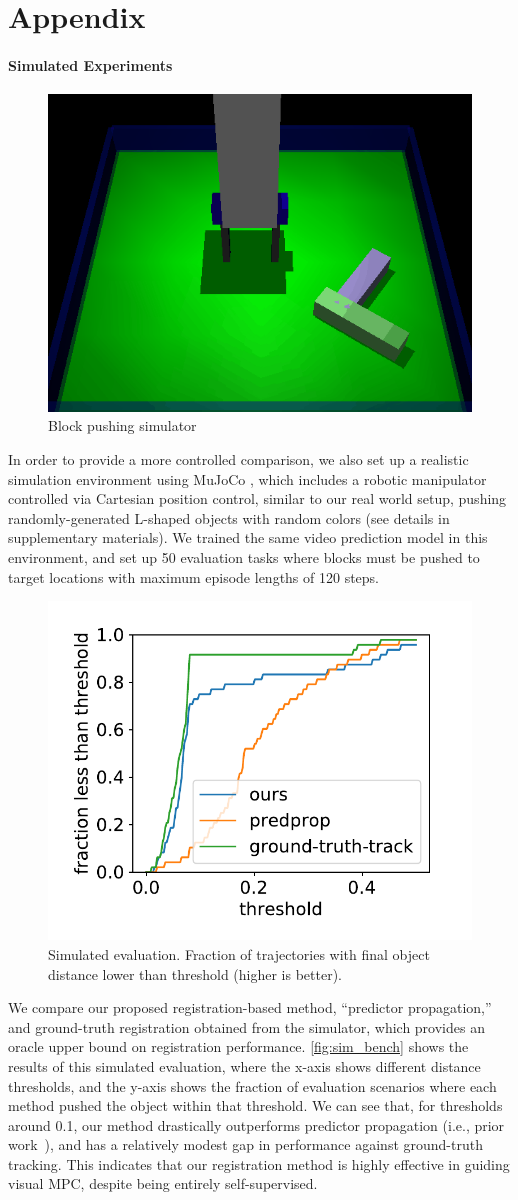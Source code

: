 \part*{Appendix}


\subsection*{Simulated Experiments}


\begin{figure}
	\centering
	\includegraphics[width=0.3\columnwidth]{images/simulator.png}
	\caption{\small{Block pushing simulator}}
	\label{fig:sim}
\end{figure}

In order to provide a more controlled comparison, we also set up a realistic simulation environment using MuJoCo \cite{todorov2012mujoco}, which includes a robotic manipulator controlled via Cartesian position control, similar to our real world setup, pushing randomly-generated L-shaped objects with random colors (see details in supplementary materials). 
We trained the same video prediction model in this environment, and set up 50 evaluation tasks where blocks must be pushed to target locations with maximum episode lengths of 120 steps. 
\begin{figure}
	\centering
	\includegraphics[width=0.4\columnwidth]{images/2obj_scores_ours-predprop-ground-truth-track.pdf}
	\caption{\small{Simulated evaluation. Fraction of trajectories with final object distance lower than threshold (higher is better).}}
	\label{fig:sim_bench}
\end{figure} 


We  compare our proposed registration-based method, ``predictor propagation,'' and ground-truth registration obtained from the simulator, which provides an oracle upper bound on registration performance. \autoref{fig:sim_bench} shows the results of this simulated evaluation, where the x-axis shows different distance thresholds, and the y-axis shows the fraction of evaluation scenarios where each method pushed the object within that threshold. We can see that, for thresholds around 0.1, our method drastically outperforms predictor propagation (i.e., prior work~\cite{sna}), and has a relatively modest gap in performance against ground-truth tracking. This indicates that our registration method is highly effective in guiding visual MPC, despite being entirely self-supervised.

